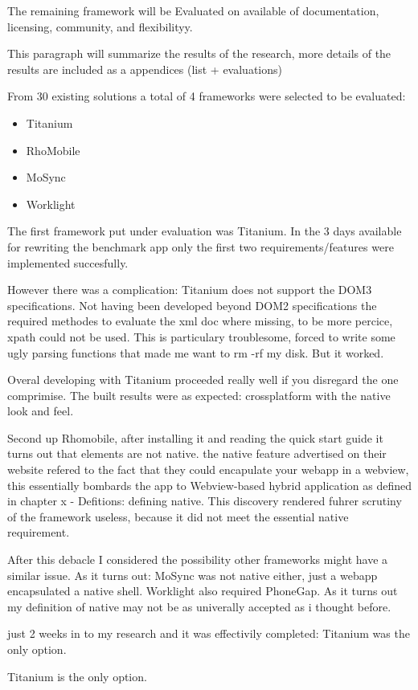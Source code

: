 The remaining framework will be Evaluated on available of documentation, licensing, community, and flexibilityy.


This paragraph will summarize the results of the research, more details of the results are included as a appendices (list + evaluations) %

From 30 existing solutions a total of 4 frameworks were selected to be evaluated:
\begin{itemize}
	\item Titanium
	\item RhoMobile
	\item MoSync
	\item Worklight
\end{itemize}

The first framework put under evaluation was Titanium. In the 3 days available for rewriting the benchmark app only the first two requirements/features were implemented succesfully.

However there was a complication: Titanium does not support the DOM3 specifications. Not having been developed beyond DOM2 specifications the required methodes to evaluate the xml doc where missing, to be more percice, xpath could not be used. This is particulary troublesome, forced to write some ugly parsing functions that made me want to rm -rf my disk. But it worked.

Overal developing with Titanium proceeded really well if you disregard the one comprimise. The built results were as expected: crossplatform with the native look and feel.

Second up Rhomobile, after installing it and reading the quick start guide it turns out that elements are not native. the native feature advertised on their website refered to the fact that they could encapulate your webapp in a webview, this essentially bombards the app to Webview-based hybrid application as defined in chapter x - Defitions: defining native. This discovery rendered fuhrer scrutiny of the framework useless, because it did not meet the essential native requirement.

After this debacle I considered the possibility other frameworks might have a similar issue. As it turns out: MoSync was not native either, just a webapp encapsulated a native shell. Worklight also required PhoneGap. As it turns out my definition of native may not be as univerally accepted as i thought before.

just 2 weeks in to my research and it was effectivily completed: Titanium was the only option.





Titanium is the only option.
